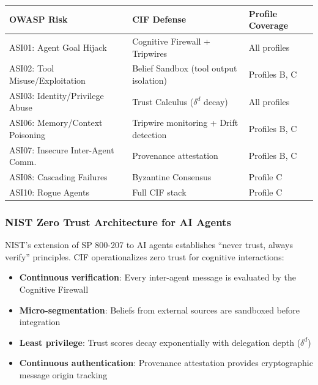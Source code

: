 \documentclass[
]{article}
\newcounter{none} %
\providecommand{\tightlist}{%
  \setlength{\itemsep}{0pt}\setlength{\parskip}{0pt}}
\begin{document}
{\def\LTcaptype{none} %
\begin{longtable}[]{@{}
  >{\raggedright\arraybackslash}p{}
  >{\raggedright\arraybackslash}p{}
  >{\raggedright\arraybackslash}p{}@{}}
\toprule\noalign{}
\begin{minipage}[b]{\linewidth}\raggedright
OWASP Risk
\end{minipage} & \begin{minipage}[b]{\linewidth}\raggedright
CIF Defense
\end{minipage} & \begin{minipage}[b]{\linewidth}\raggedright
Profile Coverage
\end{minipage} \\
\midrule\noalign{}
\endhead
\bottomrule\noalign{}
\endlastfoot
ASI01: Agent Goal Hijack & Cognitive Firewall + Tripwires & All
profiles \\
ASI02: Tool Misuse/Exploitation & Belief Sandbox (tool output isolation)
& Profiles B, C \\
ASI03: Identity/Privilege Abuse & Trust Calculus (\(\delta^d\) decay) &
All profiles \\
ASI06: Memory/Context Poisoning & Tripwire monitoring + Drift detection
& Profiles B, C \\
ASI07: Insecure Inter-Agent Comm. & Provenance attestation & Profiles B,
C \\
ASI08: Cascading Failures & Byzantine Consensus & Profile C \\
ASI10: Rogue Agents & Full CIF stack & Profile C \\
\end{longtable}
}

\subsubsection{NIST Zero Trust Architecture for AI
Agents}\label{nist-zero-trust-architecture-for-ai-agents}

NIST's extension of SP 800-207 to AI agents establishes ``never trust,
always verify'' principles. CIF operationalizes zero trust for cognitive
interactions:

\begin{itemize}
\tightlist
\item
  \textbf{Continuous verification}: Every inter-agent message is
  evaluated by the Cognitive Firewall
\item
  \textbf{Micro-segmentation}: Beliefs from external sources are
  sandboxed before integration
\item
  \textbf{Least privilege}: Trust scores decay exponentially with
  delegation depth (\(\delta^d\))
\item
  \textbf{Continuous authentication}: Provenance attestation provides
  cryptographic message origin tracking
\end{itemize}
\end{document}
